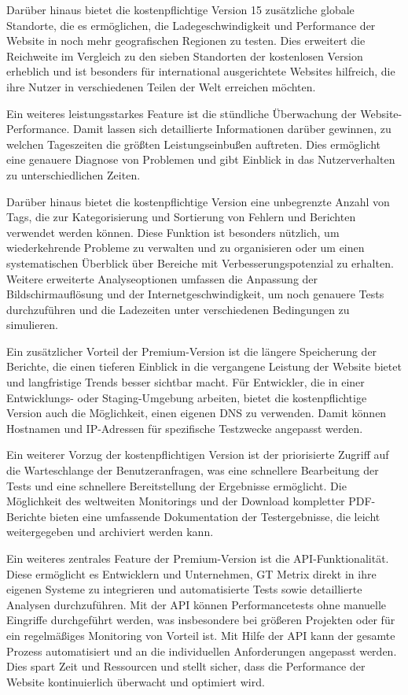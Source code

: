 Darüber hinaus bietet die kostenpflichtige Version 15 zusätzliche globale Standorte, die es ermöglichen, die Ladegeschwindigkeit und Performance der Website in noch mehr geografischen Regionen zu testen. Dies erweitert die Reichweite im Vergleich zu den sieben Standorten der kostenlosen Version erheblich und ist besonders für international ausgerichtete Websites hilfreich, die ihre Nutzer in verschiedenen Teilen der Welt erreichen möchten.

Ein weiteres leistungsstarkes Feature ist die stündliche Überwachung der Website-Performance. Damit lassen sich detaillierte Informationen darüber gewinnen, zu welchen Tageszeiten die größten Leistungseinbußen auftreten. Dies ermöglicht eine genauere Diagnose von Problemen und gibt Einblick in das Nutzerverhalten zu unterschiedlichen Zeiten.

Darüber hinaus bietet die kostenpflichtige Version eine unbegrenzte Anzahl von Tags, die zur Kategorisierung und Sortierung von Fehlern und Berichten verwendet werden können. Diese Funktion ist besonders nützlich, um wiederkehrende Probleme zu verwalten und zu organisieren oder um einen systematischen Überblick über Bereiche mit Verbesserungspotenzial zu erhalten. Weitere erweiterte Analyseoptionen umfassen die Anpassung der Bildschirmauflösung und der Internetgeschwindigkeit, um noch genauere Tests durchzuführen und die Ladezeiten unter verschiedenen Bedingungen zu simulieren.

Ein zusätzlicher Vorteil der Premium-Version ist die längere Speicherung der Berichte, die einen tieferen Einblick in die vergangene Leistung der Website bietet und langfristige Trends besser sichtbar macht. Für Entwickler, die in einer Entwicklungs- oder Staging-Umgebung arbeiten, bietet die kostenpflichtige Version auch die Möglichkeit, einen eigenen DNS zu verwenden. Damit können Hostnamen und IP-Adressen für spezifische Testzwecke angepasst werden.

Ein weiterer Vorzug der kostenpflichtigen Version ist der priorisierte Zugriff auf die Warteschlange der Benutzeranfragen, was eine schnellere Bearbeitung der Tests und eine schnellere Bereitstellung der Ergebnisse ermöglicht. Die Möglichkeit des weltweiten Monitorings und der Download kompletter PDF-Berichte bieten eine umfassende Dokumentation der Testergebnisse, die leicht weitergegeben und archiviert werden kann.

Ein weiteres zentrales Feature der Premium-Version ist die API-Funktionalität. Diese ermöglicht es Entwicklern und Unternehmen, GT Metrix direkt in ihre eigenen Systeme zu integrieren und automatisierte Tests sowie detaillierte Analysen durchzuführen. Mit der API können Performancetests ohne manuelle Eingriffe durchgeführt werden, was insbesondere bei größeren Projekten oder für ein regelmäßiges Monitoring von Vorteil ist. Mit Hilfe der API kann der gesamte Prozess automatisiert und an die individuellen Anforderungen angepasst werden. Dies spart Zeit und Ressourcen und stellt sicher, dass die Performance der Website kontinuierlich überwacht und optimiert wird. 



